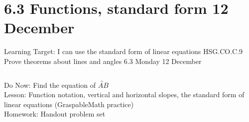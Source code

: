 \section{6.3 Functions, standard form \hfill 12 December \,}
\begin{frame}{Learning Target: I can use the standard form of linear equations}
  {HSG.CO.C.9 Prove theorems about lines and angles  \hfill \alert{6.3 Monday 12 December}}
  \begin{columns}
      Do Now: Find the equation of $\overleftrightarrow{AB}$ \\[1cm]
      Lesson: Function notation, vertical and horizontal slopes, the standard form of linear equations (GraspableMath practice) \\
      Homework: Handout problem set
    \begin{flushright}
    \end{flushright}
  \end{columns}
\end{frame}

